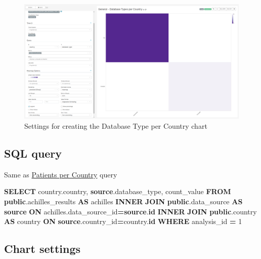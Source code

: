 \documentclass[
]{book}
\newenvironment{Shaded}{\begin{snugshade}}{\end{snugshade}}
\newcommand{\DecValTok}[1]{\textcolor[rgb]{0.00,0.00,0.81}{#1}}
\newcommand{\KeywordTok}[1]{\textcolor[rgb]{0.13,0.29,0.53}{\textbf{#1}}}
\newcommand{\NormalTok}[1]{#1}
\newcommand{\OperatorTok}[1]{\textcolor[rgb]{0.81,0.36,0.00}{\textbf{#1}}}
\begin{document}
\begin{figure}
\includegraphics[width=1\linewidth]{images/03-general/05-database_types_per_country} \caption{Settings for creating the Database Type per Country chart}\label{fig:dbsTypesPerCountry}
\end{figure}

\hypertarget{sql-query-4}{%
\subsection{SQL query}\label{sql-query-4}}

Same as \protect\hyperlink{patients-per-country}{Patients per Country} query

\begin{Shaded}
\begin{Highlighting}[]
\KeywordTok{SELECT}\NormalTok{ country.country,}
       \KeywordTok{source}\NormalTok{.database\_type,}
\NormalTok{       count\_value}
\KeywordTok{FROM} \KeywordTok{public}\NormalTok{.achilles\_results }\KeywordTok{AS}\NormalTok{ achilles }
\KeywordTok{INNER} \KeywordTok{JOIN} \KeywordTok{public}\NormalTok{.data\_source }\KeywordTok{AS} \KeywordTok{source} \KeywordTok{ON}\NormalTok{ achilles.data\_source\_id}\OperatorTok{=}\KeywordTok{source}\NormalTok{.}\KeywordTok{id}
\KeywordTok{INNER} \KeywordTok{JOIN} \KeywordTok{public}\NormalTok{.country }\KeywordTok{AS}\NormalTok{ country }\KeywordTok{ON} \KeywordTok{source}\NormalTok{.country\_id}\OperatorTok{=}\NormalTok{country.}\KeywordTok{id}
\KeywordTok{WHERE}\NormalTok{ analysis\_id }\OperatorTok{=} \DecValTok{1}
\end{Highlighting}
\end{Shaded}

\hypertarget{chart-settings-4}{%
\subsection{Chart settings}\label{chart-settings-4}}
\end{document}
